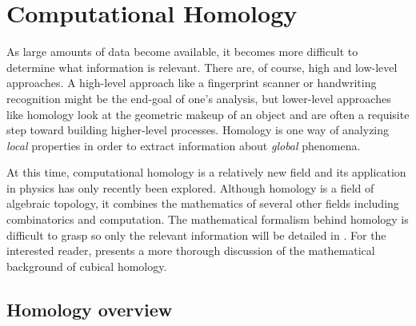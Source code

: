 \chapter{Computational Homology} \label{ch:homology}

As large amounts of data become available, it becomes more difficult to determine what information is relevant. There are, of course, high and low-level approaches. A high-level approach like a fingerprint scanner or handwriting recognition might be the end-goal of one's analysis, but lower-level approaches like homology look at the geometric makeup of an object and are often a requisite step toward building higher-level processes. Homology is one way of analyzing \textit{local} properties in order to extract information about \textit{global} phenomena.

	At this time, computational homology is a relatively new field and its application in physics has only recently been explored. Although homology is a field of algebraic topology, it combines the mathematics of several other fields including combinatorics and computation. The mathematical formalism behind homology is difficult to grasp so only the relevant information will be detailed in . For the interested reader,  presents a more thorough discussion of the mathematical background of cubical homology.
		
\section{Homology overview} \label{sect:homologyoverview}

